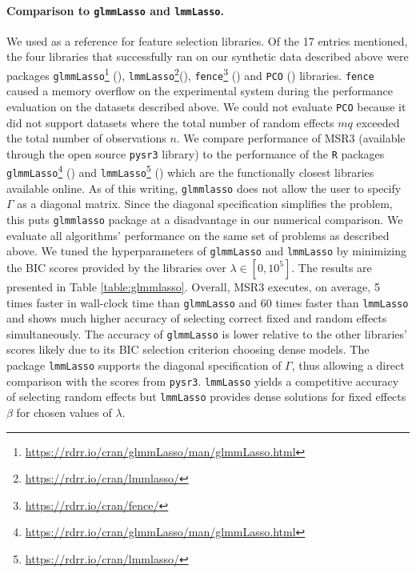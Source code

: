\paragraph{Comparison to \texttt{glmmLasso} and \texttt{lmmLasso}.}
We used \cite[Table 3]{Buscemi2019Survey} as a reference 
for feature selection libraries. Of the 17 entries mentioned, the four libraries that successfully ran on our synthetic data described above were  packages \texttt{glmmLasso}\footnote{\href{https://rdrr.io/cran/glmmLasso/man/glmmLasso.html}{https://rdrr.io/cran/glmmLasso/man/glmmLasso.html}} (\cite{groll2014variable}), \texttt{lmmLasso}\footnote{\href{https://rdrr.io/cran/lmmlasso/}{https://rdrr.io/cran/lmmlasso/}}(\cite{schelldorfer2011estimation}), \texttt{fence}\footnote{\href{https://rdrr.io/cran/fence/}{https://rdrr.io/cran/fence/}} (\cite{jiang2008fence}) and \texttt{PCO} (\cite{lin2013pco}) libraries. \texttt{fence} caused a memory overflow on the experimental system during the performance evaluation on the datasets described above. We could not evaluate {\texttt{PCO} because
it did not support  datasets where the total number of random effects $mq$ exceeded the total number of observations $n$. We compare performance of MSR3 
(available through the open source \texttt{pysr3} library) 
to the performance of the \texttt{R} packages \texttt{glmmLasso}\footnote{\href{https://rdrr.io/cran/glmmLasso/man/glmmLasso.html}{https://rdrr.io/cran/glmmLasso/man/glmmLasso.html}} (\cite{groll2014variable}) and \texttt{lmmLasso}\footnote{\href{https://rdrr.io/cran/lmmlasso/}{https://rdrr.io/cran/lmmlasso/}} (\cite{schelldorfer2011estimation}) which are the functionally closest libraries available
} online. As of this writing, \texttt{glmmlasso} does not allow the user to specify $\Gamma$ as a diagonal matrix.  Since the diagonal specification simplifies the problem, this puts \texttt{glmmlasso} package at a disadvantage in our numerical comparison. We evaluate all algorithms' performance on the same set of problems as described above. We tuned the hyperparameters of \texttt{glmmLasso} and \texttt{lmmLasso} by minimizing the BIC scores provided by the libraries over $\lambda \in [0, 10^5]$. The results are presented in Table \ref{table:glmmlasso}. Overall, MSR3 executes, on average, 5 times faster in wall-clock time than \texttt{glmmLasso} and 60 times faster than \texttt{lmmLasso} and shows much higher accuracy of selecting correct fixed and random effects simultaneously. 
{The accuracy of \texttt{glmmLasso} is lower relative to the other libraries' scores likely due to its BIC selection criterion choosing dense models.} The package \texttt{lmmLasso} supports the diagonal specification of $\Gamma$, thus allowing a direct comparison with the scores from \texttt{pysr3}.  \texttt{lmmLasso} yields a competitive accuracy of selecting random effects but \texttt{lmmLasso} provides dense solutions for fixed effects $\beta$ for chosen values of $\lambda$. 

